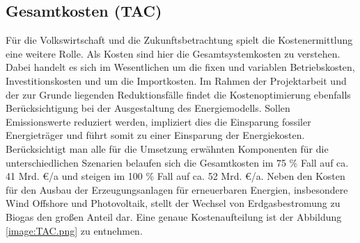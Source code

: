 \subsection{Gesamtkosten (TAC)}
Für die Volkswirtschaft und die Zukunftsbetrachtung spielt die Kostenermittlung eine weitere Rolle. Als Kosten sind hier die Gesamtsystemkosten zu verstehen. Dabei handelt es sich im Wesentlichen um die fixen und variablen Betriebskosten, Investitionskosten und um die Importkosten. Im Rahmen der Projektarbeit und der zur Grunde liegenden Reduktionsfälle findet die Kostenoptimierung ebenfalls Berücksichtigung bei der Ausgestaltung des Energiemodells. Sollen Emissionswerte reduziert werden, impliziert dies die Einsparung fossiler Energieträger und führt somit zu einer Einsparung der Energiekosten. Berücksichtigt man alle für die Umsetzung erwähnten Komponenten für die unterschiedlichen Szenarien belaufen sich die Gesamtkosten im 75 \% Fall auf ca. 41 Mrd. €/a und steigen im 100 \% Fall auf ca. 52 Mrd. €/a. Neben den Kosten für den Ausbau der Erzeugungsanlagen für erneuerbaren Energien, insbesondere Wind Offshore und Photovoltaik, stellt der Wechsel von Erdgasbestromung zu Biogas den großen Anteil dar. Eine genaue Kostenaufteilung ist der Abbildung \ref{image:TAC.png} zu entnehmen. 

